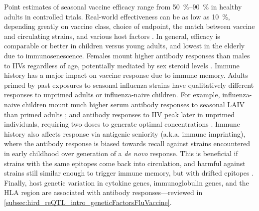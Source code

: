 Point estimates of seasonal vaccine efficacy range from \SIrange{50}{90}{\percent} in healthy adults in controlled trials.
Real-world effectiveness can be as low as \SI{10}{\percent}, depending greatly on vaccine class, choice of endpoint, the match between vaccine and circulating strains, and various host factors
\autocite{dhakal2019HostFactorsImpact,zimmermann2019FactorsThatInfluence}.
In general, efficacy is comparable or better in children versus young adults, and lowest in the elderly due to immunosenescence.
Females mount higher antibody responses than males to \glspl{IIV} regardless of age, potentially mediated by sex steroid levels \autocite{furman2014SystemsAnalysisSex,dhakal2019HostFactorsImpact}.
Immune history has a major impact on vaccine response due to immune memory.
Adults primed by past exposures to seasonal influenza strains have qualitatively different responses to unprimed adults or influenza-naive children.
For example, 
influenza-naive children mount much higher serum antibody responses to seasonal \gls{LAIV} than primed adults \autocite{luke2018InfluenzaVaccineLive};
and antibody responses to \gls{IIV} peak later in unprimed individuals, requiring two doses to generate optimal concentrations \autocite{bresee2018InactivatedInfluenzaVaccines}.
Immune history also affects response via antigenic seniority (a.k.a. immune imprinting), 
where the antibody response is biased towards recall against strains encountered in early childhood
over generation of a \textit{de novo} response.
This is beneficial if strains with the same epitopes come back into circulation, 
and harmful against strains still similar enough to trigger immune memory, but with drifted epitopes \autocite{henry2018OriginalAntigenicSin,dhakal2019HostFactorsImpact}.
Finally, host genetic variation in cytokine genes, immunoglobulin genes, and the \gls{HLA} region are associated with antibody responses---reviewed in \cref{subsec:hird_reQTL_intro_geneticFactorsFluVaccine}.

